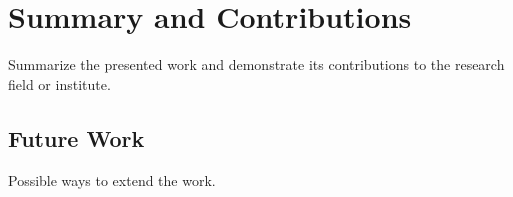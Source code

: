 \section{Summary and Contributions}
\label{s:SummaryAndContributions}

Summarize the presented work and demonstrate its contributions to the
research field or institute.



\subsection{Future Work}
\label{s:FutureWork}

Possible ways to extend the work.
